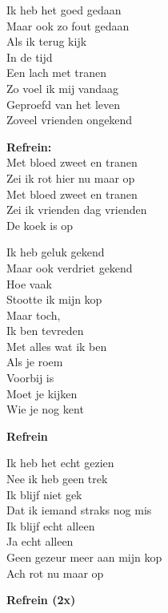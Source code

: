 Ik heb het goed gedaan\\
Maar ook zo fout gedaan\\
Als ik terug kijk\\
In de tijd\\
Een lach met tranen\\
Zo voel ik mij vandaag\\
Geproefd van het leven\\
Zoveel vrienden ongekend

\textbf{Refrein:}\\
Met bloed zweet en tranen\\
Zei ik rot hier nu maar op\\
Met bloed zweet en tranen\\
Zei ik vrienden dag vrienden\\
De koek is op

Ik heb geluk gekend\\
Maar ook verdriet gekend\\
Hoe vaak\\
Stootte ik mijn kop\\
Maar toch,\\
Ik ben tevreden\\
Met alles wat ik ben\\
Als je roem\\
Voorbij is\\
Moet je kijken\\
Wie je nog kent

\textbf{Refrein}

Ik heb het echt gezien\\
Nee ik heb geen trek\\
Ik blijf niet gek\\
Dat ik iemand straks nog mis\\
Ik blijf echt alleen\\
Ja echt alleen\\
Geen gezeur meer aan mijn kop\\
Ach rot nu maar op

\textbf{Refrein (2x)}
